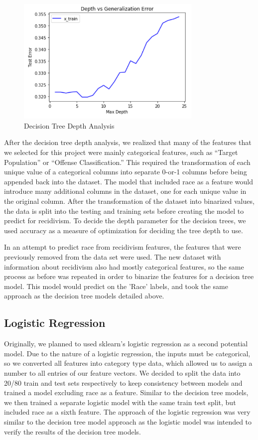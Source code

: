 \documentclass[11pt, sigconf]{acmart}
\begin{document}
\begin{figure}[h] 	
\centering
\includegraphics[width=3.5in]{tree_depth.png}
\caption{Decision Tree Depth Analysis}
\end{figure}

After the decision tree depth analysis, we realized that many of the features that we selected for this project were mainly categorical features, such as ``Target Population'' or ``Offense Classification.'' This required the transformation of each unique value of a categorical columns into separate 0-or-1 columns before being appended back into the dataset. The model that included race as a feature would introduce many additional columns in the dataset, one for each unique value in the original column. After the transformation of the dataset into binarized values, the data is split into the testing and training sets before creating the model to predict for recidivism. To decide the depth parameter for the decision trees, we used accuracy as a measure of optimization for deciding the tree depth to use. 

In an attempt to predict race from recidivism features, the features that were previously removed from the data set were used. The new dataset with information about recidivism also had mostly categorical features, so the same process as before was repeated in order to binarize the features for a decision tree model. This model would predict on the 'Race' labels, and took the same approach as the decision tree models detailed above. 

\subsection{Logistic Regression}
\hspace{5mm}Originally, we planned to used sklearn's logistic regression as a second potential model. Due to the nature of a logistic regression, the inputs must be categorical, so we converted all features into category type data, which allowed us to assign a number to all entries of our feature vectors. We decided to split the data into 20/80 train and test sets respectively to keep consistency between models and trained a model excluding race as a feature. Similar to the decision tree models, we then trained a separate logistic model with the same train test split, but included race as a sixth feature. The approach of the logistic regression was very similar to the decision tree model approach as the logistic model was intended to verify the results of the decision tree models.
\end{document}
